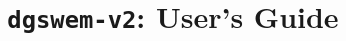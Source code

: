 \documentclass[10pt,letterpaper]{report}
\begin{document}
\title{ \texttt{dgswem-v2}: User's Guide}

\maketitle
\tableofcontents












\end{document}
